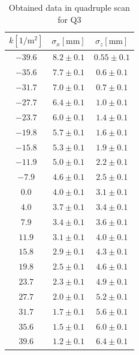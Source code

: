 \documentclass[12pt]{article}
\begin{document}
\begin{table}[H]
    \centering
    \begin{tabular}{c|c|c}
    \hline
    \hline
        $k \mathrm{[1/m^2]}$& $\sigma_x \mathrm{[mm]}$ & $\sigma_z \mathrm{[mm]}$ \\
    \hline
        $ -39.6 $ & $ 8.2 \pm 0.1 $ & $ 0.55 \pm 0.1 $ \\ 
        $ -35.6 $ & $ 7.7 \pm 0.1 $ & $ 0.6 \pm 0.1 $ \\ 
        $ -31.7 $ & $ 7.0 \pm 0.1 $ & $ 0.7 \pm 0.1 $ \\ 
        $ -27.7 $ & $ 6.4 \pm 0.1 $ & $ 1.0 \pm 0.1 $ \\ 
        $ -23.7 $ & $ 6.0 \pm 0.1 $ & $ 1.4 \pm 0.1 $ \\ 
        $ -19.8 $ & $ 5.7 \pm 0.1 $ & $ 1.6 \pm 0.1 $ \\ 
        $ -15.8 $ & $ 5.3 \pm 0.1 $ & $ 1.9 \pm 0.1 $ \\ 
        $ -11.9 $ & $ 5.0 \pm 0.1 $ & $ 2.2 \pm 0.1 $ \\ 
        $ -7.9 $ & $ 4.6 \pm 0.1 $ & $ 2.5 \pm 0.1 $ \\ 
        $ 0.0 $ & $ 4.0 \pm 0.1 $ & $ 3.1 \pm 0.1 $ \\ 
        $ 4.0 $ & $ 3.7 \pm 0.1 $ & $ 3.4 \pm 0.1 $ \\ 
        $ 7.9 $ & $ 3.4 \pm 0.1 $ & $ 3.6 \pm 0.1 $ \\ 
        $ 11.9 $ & $ 3.1 \pm 0.1 $ & $ 4.0 \pm 0.1 $ \\ 
        $ 15.8 $ & $ 2.9 \pm 0.1 $ & $ 4.3 \pm 0.1 $ \\ 
        $ 19.8 $ & $ 2.5 \pm 0.1 $ & $ 4.6 \pm 0.1 $ \\ 
        $ 23.7 $ & $ 2.3 \pm 0.1 $ & $ 4.9 \pm 0.1 $ \\ 
        $ 27.7 $ & $ 2.0 \pm 0.1 $ & $ 5.2 \pm 0.1 $ \\ 
        $ 31.7 $ & $ 1.7 \pm 0.1 $ & $ 5.6 \pm 0.1 $ \\ 
        $ 35.6 $ & $ 1.5 \pm 0.1 $ & $ 6.0 \pm 0.1 $ \\ 
        $ 39.6 $ & $ 1.2 \pm 0.1 $ & $ 6.4 \pm 0.1 $ \\  
        \hline
    \end{tabular}
    \caption{Obtained data in quadruple scan for Q3}
    \label{Q3row}
\end{table}
\end{document}
